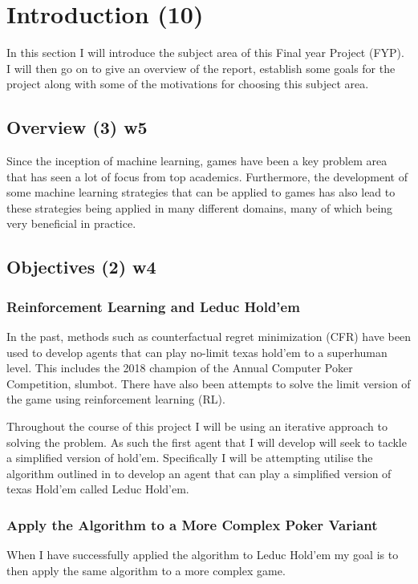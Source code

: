 \chapter{Introduction (10)}
\label{ch:intro}
In this section I will introduce the subject area of this Final year Project (FYP).
I will then go on to give an overview of the report, establish some goals for the project along with some of
the motivations for choosing this subject area.


\section{Overview (3) w5}\label{sec:overview}
Since the inception of machine learning, games have been a key problem area that has seen a lot of focus from
top academics.
Furthermore, the development of some machine learning strategies that can be applied to games has also lead to these
strategies being applied in many different domains, many of which being very beneficial in practice.


\section{Objectives (2) w4}\label{sec:objectives}
\subsection{Reinforcement Learning and Leduc Hold'em}\label{subsec:primaryObjectives}
In the past, methods such as counterfactual regret minimization (CFR) have been used to develop agents that can
play no-limit texas hold'em to a superhuman level.
This includes the 2018 champion of the Annual Computer Poker Competition, slumbot\cite{jackson2013slumbot}.
There have also been attempts to solve the limit version of the game using reinforcement learning
(RL)\cite{heinrich2016deep}.

Throughout the course of this project I will be using an iterative approach to solving the problem.
As such the first agent that I will develop will seek to tackle a simplified version of hold'em.
Specifically I will be attempting utilise the algorithm outlined in\cite{heinrich2015fictitious} to develop an agent
that can play a simplified version of texas Hold'em called Leduc Hold'em.

\subsection{Apply the Algorithm to a More Complex Poker Variant}\label{subsec:pokerPlayingAgent}
When I have successfully applied the algorithm to Leduc Hold'em my goal is to then apply the same algorithm
to a more complex game.

